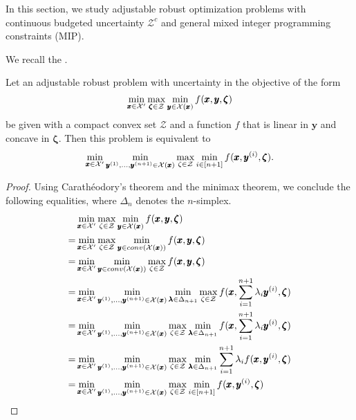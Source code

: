 In this section, we study adjustable robust optimization problems with 
continuous budgeted uncertainty $\mathcal{Z}^{c}$ and general mixed integer programming constraints (MIP).

We recall the  \cite{bold2020}.

\begin{theorem}\label{th1}
Let an adjustable robust problem with uncertainty in the objective of the form
\[ \min_{\pmb{x}\in \mathcal{X}'} \max_{\pmb{\zeta}\in\mathcal{Z}} \min_{\pmb{y}\in\mathcal{X}(\pmb{x})} f(\pmb{x},\pmb{y},\pmb{\zeta}) \]
be given with a compact convex set $\mathcal{Z}$ and a function $f$ that is linear in $\pmb{y}$ and concave in $\pmb{\zeta}$. Then this problem is equivalent to
\[ \min_{\pmb{x}\in\mathcal{X}'} \min_{\pmb{y}^{(1)},\ldots,\pmb{y}^{(n+1)}\in\mathcal{X}(\pmb{x})} \max_{\zeta\in\mathcal{Z}} \min_{i\in[n+1]} f(\pmb{x},\pmb{y}^{(i)},\pmb{\zeta}). \]
\end{theorem}
\begin{proof}
Using Carath\'eodory's theorem and the minimax theorem, we conclude the following equalities, where $\Delta_n$ denotes the $n$-simplex.
\begin{align*}
&\min_{\pmb{x}\in\X'} \max_{\zeta\in\mathcal{Z}}\min_{\pmb{y}\in\X(\pmb{x})} f(\pmb{x},\pmb{y},\pmb{\zeta}) \\
% 
= & \min_{\pmb{x}\in\X'} \max_{\zeta\in\mathcal{Z}}\min_{\pmb{y}\in conv(\X(\pmb{x}))} f(\pmb{x},\pmb{y},\pmb{\zeta}) \\
% 
= & \min_{\pmb{x}\in\X'} \min_{\pmb{y}\in conv(\X(\pmb{x}))} \max_{\zeta\in\mathcal{Z}} f(\pmb{x},\pmb{y},\pmb{\zeta}) \\
% 
= & \min_{\pmb{x}\in\X'} 
\min_{\pmb{y}^{(1)},\ldots,\pmb{y}^{(n+1)}\in\X(\pmb{x})} \min_{\pmb{\lambda}\in\Delta_{n+1}} 
\max_{\zeta\in\mathcal{Z}} f(\pmb{x}, \sum_{i=1}^{n+1}\lambda_i\pmb{y}^{(i)},\pmb{\zeta}) \\
% 
= & \min_{\pmb{x}\in\X'} \min_{\pmb{y}^{(1)},\ldots,\pmb{y}^{(n+1)}\in\X(\pmb{x})}  
\max_{\zeta\in\mathcal{Z}} \min_{\pmb{\lambda}\in\Delta_{n+1}} f(\pmb{x}, \sum_{i=1}^{n+1}\lambda_i\pmb{y}^{(i)},\pmb{\zeta}) \\
% 
= & \min_{\pmb{x}\in\X'} \min_{\pmb{y}^{(1)},\ldots,\pmb{y}^{(n+1)}\in\X(\pmb{x})}  
\max_{\zeta\in\mathcal{Z}} \min_{\pmb{\lambda}\in\Delta_{n+1}} \sum_{i=1}^{n+1}\lambda_i f(\pmb{x}, \pmb{y}^{(i)},\pmb{\zeta}) \\
% 
= & \min_{\pmb{x}\in\X'} \min_{\pmb{y}^{(1)},\ldots,\pmb{y}^{(n+1)}\in\X(\pmb{x})}  
\max_{\zeta\in\mathcal{Z}} \min_{i\in[n+1]} f(\pmb{x}, \pmb{y}^{(i)},\pmb{\zeta}) 
\end{align*}
\end{proof}

